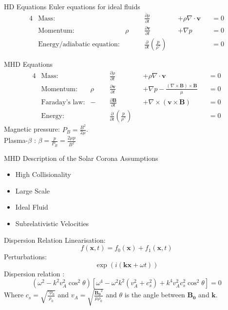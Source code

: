 \documentclass{beamer}
\begin{document}
\begin{frame}{HD Equations}
Euler equations for ideal fluids
\begin{alignat*}{4}
	&\text{Mass:} &\quad\quad &\frac{\partial \rho}{\partial t} & &+ \rho \nabla \cdot \mathbf v & &=  0 \\
	&\text{Momentum:} & \rho& \frac{\partial \mathbf v}{\partial t} & &+ \nabla p & &= 0\\
	&\text{Energy/adiabatic equation:} & &\frac{\partial }{\partial t} \left( \frac{p}{\rho^{\gamma}} \right)  & & & &= 0
\end{alignat*}
\end{frame}
\begin{frame}{MHD Equations}
    \begin{alignat*}{4}
	&\text{Mass:} &\quad\quad &\frac{\partial \rho}{\partial t} & & +\rho \nabla \cdot \mathbf v& &= 0 \\ 	
	&\text{Momentum:} & \rho& \frac{\partial \mathbf v}{\partial t} & &+ \nabla p - \frac{(\nabla \times \mathbf B) \times \mathbf B}{\mu}& &=  0  \\
	&\text{Faraday's law:} & -&\frac{\partial \mathbf B}{\partial t} & &+ \nabla \times (\mathbf v \times \mathbf B)& &= 0 \\
	&\text{Energy:} & &\frac{\partial }{\partial t} \left( \frac{p}{\rho^{\gamma}} \right)  & & & &= 0 
\end{alignat*}
Magnetic pressure: $P_B = \frac{B^2}{2\mu}$. \\Plasma-$\beta$ : $\beta = \frac{p}{P_B} = \frac{2\mu p}{B^2}$
\end{frame}
\begin{frame}{MHD Description of the Solar Corona}
    \centering
    Assumptions \cite{goedbloed2004principles}
    \begin{itemize}
        \item High Collisionality
        \item Large Scale
        \item Ideal Fluid
        \item Subrelativistic Velocities
    \end{itemize}
\end{frame}
\begin{frame}{Dispersion Relation}
    Linearisation:
        \begin{equation*}
            f(\mathbf{x},t) = f_0(\mathbf{x}) + f_1(\mathbf{x},t)
        \end{equation*}
    Perturbations:
        \begin{equation*}
            \exp(i(\mathbf{kx} + \omega t))
        \end{equation*}
	Dispersion relation \cite{Fitzpatricknotes}:
        \begin{equation*}
	        (\omega^2 - k^2 v_A^2 \cos^2 \theta)\left[ \omega^{4} - \omega^2k^2(v_A^2 + c_s^2) + k^{4}v_A^2c_s^2\cos^2\theta \right]  = 0
        \end{equation*}
        Where $c_s = \sqrt{\frac{\gamma p_0}{\rho_0}}$ and $v_A = \sqrt{\frac{\mathbf{B_0}^2}{\mu\rho_0}}$ and $\theta$ is the angle between $\mathbf{B_0}$ and $\mathbf{k}$.
\end{frame}
\end{document}
